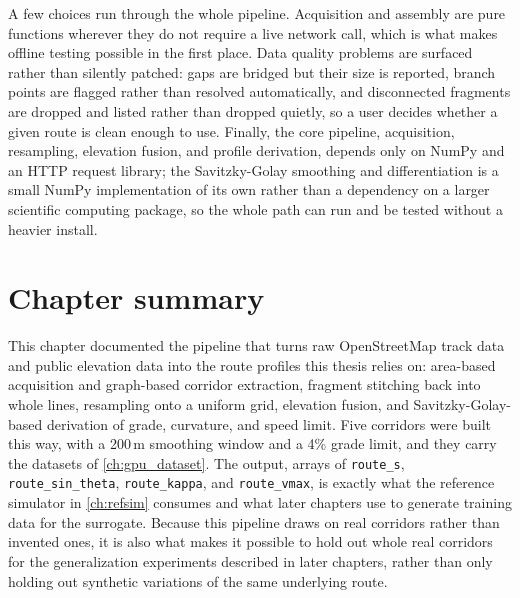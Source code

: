 A few choices run through the whole pipeline. Acquisition and assembly are pure functions wherever they do not require a live network call, which is what makes offline testing possible in the first place. Data quality problems are surfaced rather than silently patched: gaps are bridged but their size is reported, branch points are flagged rather than resolved automatically, and disconnected fragments are dropped and listed rather than dropped quietly, so a user decides whether a given route is clean enough to use. Finally, the core pipeline, acquisition, resampling, elevation fusion, and profile derivation, depends only on NumPy and an HTTP request library; the Savitzky-Golay smoothing and differentiation is a small NumPy implementation of its own rather than a dependency on a larger scientific computing package, so the whole path can run and be tested without a heavier install.

\section{Chapter summary}

This chapter documented the pipeline that turns raw OpenStreetMap track data and public elevation data into the route profiles this thesis relies on: area-based acquisition and graph-based corridor extraction, fragment stitching back into whole lines, resampling onto a uniform grid, elevation fusion, and Savitzky-Golay-based derivation of grade, curvature, and speed limit. Five corridors were built this way, with a 200\,m smoothing window and a 4\% grade limit, and they carry the datasets of \cref{ch:gpu_dataset}. The output, arrays of \texttt{route\_s}, \texttt{route\_sin\_theta}, \texttt{route\_kappa}, and \texttt{route\_vmax}, is exactly what the reference simulator in \cref{ch:refsim} consumes and what later chapters use to generate training data for the surrogate. Because this pipeline draws on real corridors rather than invented ones, it is also what makes it possible to hold out whole real corridors for the generalization experiments described in later chapters, rather than only holding out synthetic variations of the same underlying route.
